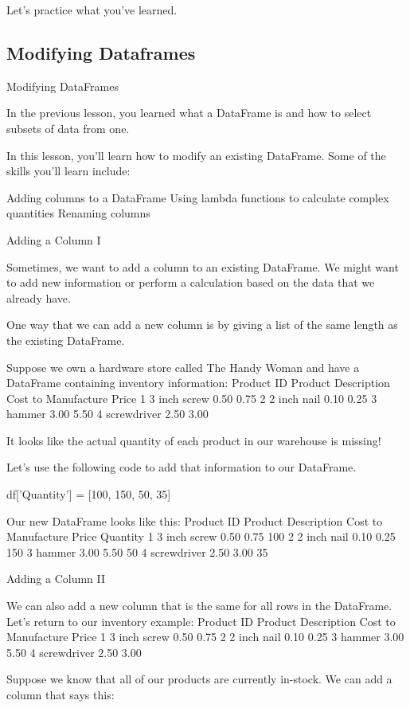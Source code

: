 \documentclass{journal}
\begin{document}
Let's practice what you've learned.


\subsection{Modifying Dataframes}
Modifying DataFrames

In the previous lesson, you learned what a DataFrame is and how to select subsets of data from one.

In this lesson, you'll learn how to modify an existing DataFrame. Some of the skills you'll learn include:

    Adding columns to a DataFrame
    Using lambda functions to calculate complex quantities
    Renaming columns

Adding a Column I

Sometimes, we want to add a column to an existing DataFrame. We might want to add new information or perform a calculation based on the data that we already have.

One way that we can add a new column is by giving a list of the same length as the existing DataFrame.

Suppose we own a hardware store called The Handy Woman and have a DataFrame containing inventory information:
Product ID 	Product Description 	Cost to Manufacture 	Price
1 	3 inch screw 	0.50 	0.75
2 	2 inch nail 	0.10 	0.25
3 	hammer 	3.00 	5.50
4 	screwdriver 	2.50 	3.00

It looks like the actual quantity of each product in our warehouse is missing!

Let's use the following code to add that information to our DataFrame.

df['Quantity'] = [100, 150, 50, 35]

Our new DataFrame looks like this:
Product ID 	Product Description 	Cost to Manufacture 	Price 	Quantity
1 	3 inch screw 	0.50 	0.75 	100
2 	2 inch nail 	0.10 	0.25 	150
3 	hammer 	3.00 	5.50 	50
4 	screwdriver 	2.50 	3.00 	35


Adding a Column II

We can also add a new column that is the same for all rows in the DataFrame. Let's return to our inventory example:
Product ID 	Product Description 	Cost to Manufacture 	Price
1 	3 inch screw 	0.50 	0.75
2 	2 inch nail 	0.10 	0.25
3 	hammer 	3.00 	5.50
4 	screwdriver 	2.50 	3.00

Suppose we know that all of our products are currently in-stock. We can add a column that says this:
\end{document}
